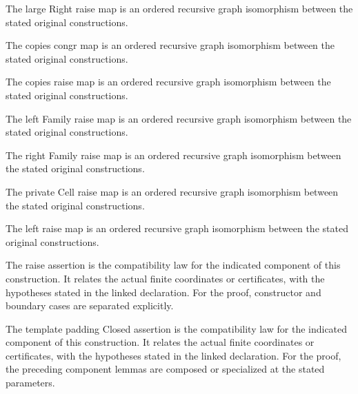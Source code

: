 The large Right raise map is an ordered recursive graph isomorphism between the stated original constructions.
\par{}

The copies congr map is an ordered recursive graph isomorphism between the stated original constructions.
\par{}

The copies raise map is an ordered recursive graph isomorphism between the stated original constructions.
\par{}

The left Family raise map is an ordered recursive graph isomorphism between the stated original constructions.
\par{}

The right Family raise map is an ordered recursive graph isomorphism between the stated original constructions.
\par{}

The private Cell raise map is an ordered recursive graph isomorphism between the stated original constructions.
\par{}

The left raise map is an ordered recursive graph isomorphism between the stated original constructions.
\par{}

The raise assertion is the compatibility law for the indicated component of this construction. It relates the actual finite coordinates or certificates, with the hypotheses stated in the linked declaration.
For the proof, constructor and boundary cases are separated explicitly.
\par{}

The template padding Closed assertion is the compatibility law for the indicated component of this construction. It relates the actual finite coordinates or certificates, with the hypotheses stated in the linked declaration.
For the proof, the preceding component lemmas are composed or specialized at the stated parameters.
\par{}

